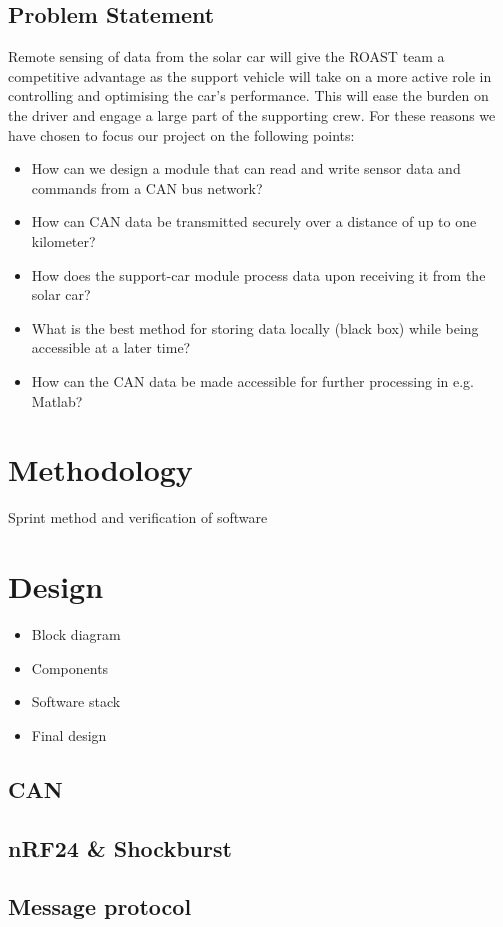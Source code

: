 \documentclass[conference]{IEEEtran}
\begin{document}
\subsection{Problem Statement}
Remote sensing of data from the solar car will give the ROAST team a competitive advantage as the support vehicle will take on a more active role in controlling and optimising the car's performance. This will ease the burden on the driver and engage a large part of the supporting crew. For these reasons we have chosen to focus our project on the following points:   
\begin{itemize}
    \item How can we design a module that can read and write sensor data and commands from a CAN bus network? 
    \item How can CAN data be transmitted securely over a distance of up to one kilometer?
    \item How does the support-car module process data upon receiving it from the solar car?
    \item What is the best method for storing data locally (black box) while being accessible at a later time?
    \item How can the CAN data be made accessible for further processing in e.g. Matlab?
\end{itemize}


\section{Methodology}
Sprint method and verification of software
\section{Design}
\begin{itemize}
    \item Block diagram
    \item Components
    \item Software stack
    \item Final design
\end{itemize}
\subsection{CAN} %
\subsection{nRF24 \& Shockburst} %
\subsection{Message protocol}
\end{document}
